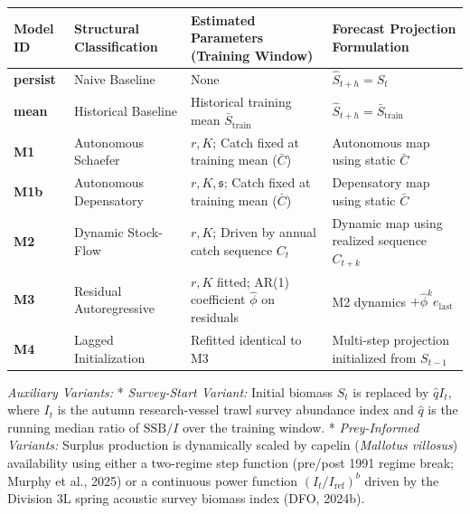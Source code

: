 \documentclass[11pt]{article}
\begin{document}
{\def\LTcaptype{none} %
\begin{longtable}[]{@{}
  >{\raggedright\arraybackslash}p{}
  >{\raggedright\arraybackslash}p{}
  >{\raggedright\arraybackslash}p{}
  >{\raggedright\arraybackslash}p{}@{}}
\toprule\noalign{}
\begin{minipage}[b]{\linewidth}\raggedright
Model ID
\end{minipage} & \begin{minipage}[b]{\linewidth}\raggedright
Structural Classification
\end{minipage} & \begin{minipage}[b]{\linewidth}\raggedright
Estimated Parameters (Training Window)
\end{minipage} & \begin{minipage}[b]{\linewidth}\raggedright
Forecast Projection Formulation
\end{minipage} \\
\midrule\noalign{}
\endhead
\bottomrule\noalign{}
\endlastfoot
\textbf{persist} & Naive Baseline & None & \(\hat{S}_{t+h} = S_t\) \\
\textbf{mean} & Historical Baseline & Historical training mean
\(\bar{S}_{\mathrm{train}}\) &
\(\hat{S}_{t+h} = \bar{S}_{\mathrm{train}}\) \\
\textbf{M1} & Autonomous Schaefer & \(r, K\); Catch fixed at training
mean (\(\bar{C}\)) & Autonomous map using static \(\bar{C}\) \\
\textbf{M1b} & Autonomous Depensatory & \(r, K, \mathfrak{s}\); Catch
fixed at training mean (\(\bar{C}\)) & Depensatory map using static
\(\bar{C}\) \\
\textbf{M2} & Dynamic Stock-Flow & \(r, K\); Driven by annual catch
sequence \(C_t\) & Dynamic map using realized sequence \(C_{t+k}\) \\
\textbf{M3} & Residual Autoregressive & \(r, K\) fitted; AR(1)
coefficient \(\hat{\phi}\) on residuals & M2 dynamics
\(+ \hat{\phi}^k e_{\mathrm{last}}\) \\
\textbf{M4} & Lagged Initialization & Refitted identical to M3 &
Multi-step projection initialized from \(S_{t-1}\) \\
\end{longtable}
}

\emph{Auxiliary Variants:} * \emph{Survey-Start Variant:} Initial
biomass \(S_t\) is replaced by \(\hat{q} I_t\), where \(I_t\) is the
autumn research-vessel trawl survey abundance index and \(\hat{q}\) is
the running median ratio of \(\mathrm{SSB}/I\) over the training window.
* \emph{Prey-Informed Variants:} Surplus production is dynamically
scaled by capelin (\emph{Mallotus villosus}) availability using either a
two-regime step function (pre/post 1991 regime break; Murphy et al.,
2025) or a continuous power function \((I_t / I_{\mathrm{ref}})^b\)
driven by the Division 3L spring acoustic survey biomass index (DFO,
2024b).
\end{document}
